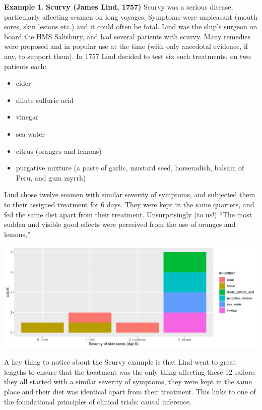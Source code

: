 \documentclass[
  openany]{book}
\providecommand{\tightlist}{%
  \setlength{\itemsep}{0pt}\setlength{\parskip}{0pt}}
\theoremstyle{definition}
\theoremstyle{definition}
\newtheorem{example}{Example}[chapter]
\theoremstyle{definition}
\theoremstyle{definition}
\theoremstyle{remark}
\begin{document}
\begin{example}
\textbf{Scurvy (James Lind, 1757)}
Scurvy was a serious disease, particularly affecting seamen on long voyages. Symptoms were unpleasant (mouth sores, skin lesions etc.) and it could often be fatal. Lind was the ship's surgeon on board the HMS Salisbury, and had several patients with scurvy. Many remedies were proposed and in popular use at the time (with only anecdotal evidence, if any, to support them). In 1757 Lind decided to test six such treatments, on two patients each:

\begin{itemize}
\tightlist
\item
  cider
\item
  dilute sulfuric acid
\item
  vinegar
\item
  sea water
\item
  citrus (oranges and lemons)
\item
  purgative mixture (a paste of garlic, mustard seed, horseradish, balsam of Peru, and gum myrrh)
\end{itemize}

Lind chose twelve seamen with similar severity of symptoms, and subjected them to their assigned treatment for 6 days. They were kept in the same quarters, and fed the same diet apart from their treatment. Unsurprisingly (to us!) ``The most sudden and visible good effects were perceived from the use of oranges and lemons,''

\includegraphics{CT4H_notes_files/figure-latex/unnamed-chunk-2-1.pdf}
\end{example}

A key thing to notice about the Scurvy example is that Lind went to great lengths to ensure that the treatment was the only thing affecting these 12 sailors: they all started with a similar severity of symptoms, they were kept in the same place and their diet was identical apart from their treatment. This links to one of the foundational principles of clinical trials: causal inference.
\end{document}
